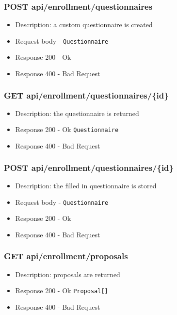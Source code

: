 \subsubsection{POST api/enrollment/questionnaires}
\begin{itemize}
    \item Description: a custom questionnaire is created
    \item Request body - \verb|Questionnaire|
    \item Response 200 - Ok
    \item Response 400 - Bad Request
\end{itemize}

\subsubsection{GET api/enrollment/questionnaires/\{id\}}
\begin{itemize}
    \item Description: the questionnaire is returned
    \item Response 200 - Ok \verb|Questionnaire|
    \item Response 400 - Bad Request
\end{itemize}

\subsubsection{POST api/enrollment/questionnaires/\{id\}}
\begin{itemize}
    \item Description: the filled in questionnaire is stored
    \item Request body - \verb|Questionnaire|
    \item Response 200 - Ok
    \item Response 400 - Bad Request
\end{itemize}

\subsubsection{GET api/enrollment/proposals}
\begin{itemize}
    \item Description: proposals are returned
    \item Response 200 - Ok \verb|Proposal[]|
    \item Response 400 - Bad Request
\end{itemize}


